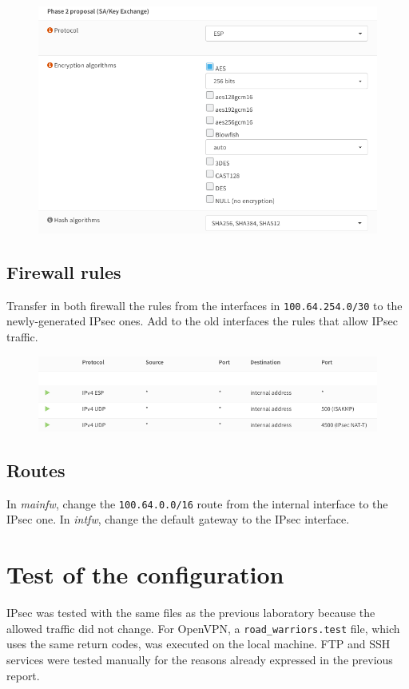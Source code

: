 \documentclass{homework}
\newcommand{\intfw}{\textit{intfw}\xspace}
\newcommand{\mainfw}{\textit{mainfw}\xspace}
\begin{document}
    \begin{figure}[H]
        \centering
        \includegraphics[width=\linewidth]{ipsec/phase2-proposal}
        \label{fig:ipsec-phase2-proposal}
    \end{figure}
    
    \subsection{Firewall rules}
    Transfer in both firewall the rules from the interfaces in \texttt{100.64.254.0/30} to the newly-generated IPsec ones.
    Add to the old interfaces the rules that allow IPsec traffic.
    \begin{figure}[H]
        \centering
        \includegraphics[width=\linewidth]{ipsec/rules}
        \label{fig:ipsec-rules}
    \end{figure}
    
    \subsection{Routes}
    In \mainfw, change the \texttt{100.64.0.0/16} route from the internal interface to the IPsec one.
    In \intfw, change the default gateway to the IPsec interface.
    
    
    \section{Test of the configuration}
    IPsec was tested with the same files as the previous laboratory because the allowed traffic did not change.
    For OpenVPN, a \texttt{road\_warriors.test} file, which uses the same return codes, was executed on the local machine.
    FTP and SSH services were tested manually for the reasons already expressed in the previous report.
    
\end{document}
